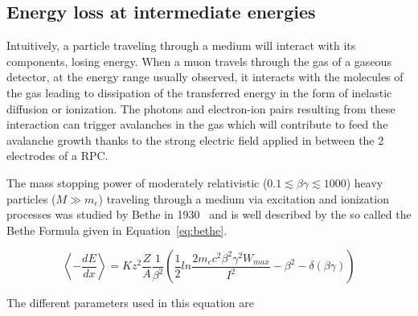 	\subsection{Energy loss at intermediate energies}
	\label{chapt4:ssec:ElossBethe}
	
	Intuitively, a particle traveling through a medium will interact with its components, losing energy. When a muon travels through the gas of a gaseous detector, at the energy range usually observed, it interacts with the molecules of the gas leading to dissipation of the transferred energy in the form of inelastic diffusion or ionization. The photons and electron-ion pairs resulting from these interaction can trigger avalanches in the gas which will contribute to feed the avalanche growth thanks to the strong electric field applied in between the 2 electrodes of a RPC.
	
	The mass stopping power of moderately relativistic ($0.1 \lesssim \beta\gamma \lesssim 1000$) heavy particles ($M \gg m_e$) traveling through a medium via excitation and ionization processes was studied by Bethe in 1930~\cite{BETHE1930} and is well described by the so called the Bethe Formula given in Equation~\ref{eq:bethe}.
	
	\begin{equation}
	\label{eq:bethe}
	\left\langle-\frac{dE}{dx}\right\rangle = Kz^2\frac{Z}{A}\frac{1}{\beta^2}\left(\frac{1}{2}ln\frac{2m_ec^2\beta^2\gamma^2W_{max}}{I^2}-\beta^2-\delta(\beta\gamma)\right)
	\end{equation}
	
	The different parameters used in this equation are
	
